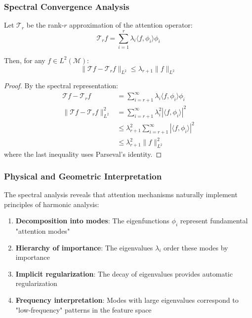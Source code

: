 \subsubsection{Spectral Convergence Analysis}

\begin{theorem}\label{theorem:finite_rank_convergence}
    Let $\mathcal{T}_r$ be the rank-$r$ approximation of the attention operator:
    \begin{equation}
        \mathcal{T}_r f = \sum_{i=1}^{r} \lambda_i \langle f, \phi_i \rangle \phi_i
        \label{eq:finite_rank_approximation}
    \end{equation}

    Then, for any $f \in L^2(\mathcal{M})$:
    \begin{equation}
        \|\mathcal{T}f - \mathcal{T}_r f\|_{L^2} \leq \lambda_{r+1} \|f\|_{L^2}
        \label{eq:approximation_error_bound}
    \end{equation}
\end{theorem}

\begin{proof}
    By the spectral representation:
    \begin{align}
        \mathcal{T}f - \mathcal{T}_r f &= \sum_{i=r+1}^{\infty} \lambda_i \langle f, \phi_i \rangle \phi_i \\
        \|\mathcal{T}f - \mathcal{T}_r f\|_{L^2}^2 &= \sum_{i=r+1}^{\infty} \lambda_i^2 |\langle f, \phi_i \rangle|^2 \\
        &\leq \lambda_{r+1}^2 \sum_{i=r+1}^{\infty} |\langle f, \phi_i \rangle|^2 \\
        &\leq \lambda_{r+1}^2 \|f\|_{L^2}^2
    \end{align}
    where the last inequality uses Parseval's identity.
\end{proof}

\subsubsection{Physical and Geometric Interpretation}

The spectral analysis reveals that attention mechanisms naturally implement principles of harmonic analysis:

\begin{enumerate}
    \item \textbf{Decomposition into modes}: The eigenfunctions $\phi_i$ represent fundamental "attention modes"
    \item \textbf{Hierarchy of importance}: The eigenvalues $\lambda_i$ order these modes by importance
    \item \textbf{Implicit regularization}: The decay of eigenvalues provides automatic regularization
    \item \textbf{Frequency interpretation}: Modes with large eigenvalues correspond to "low-frequency" patterns in the feature space
\end{enumerate}

